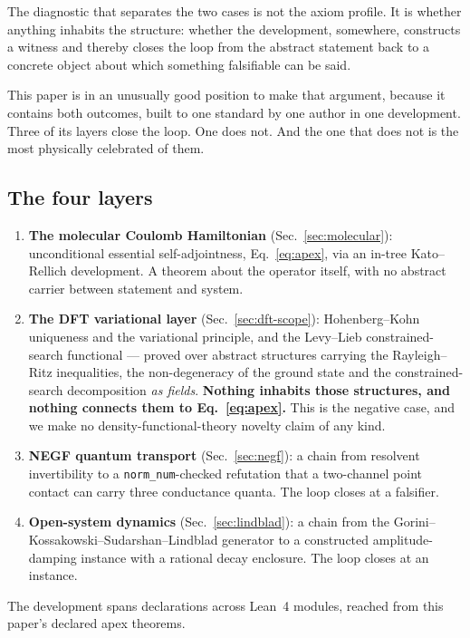 \documentclass[aps,prd,reprint,nofootinbib,superscriptaddress]{revtex4-2}
\newcommand{\Lean}{Lean~4}
\begin{document}
The diagnostic that separates the two cases is not the axiom profile. It is whether anything inhabits
the structure: whether the development, somewhere, constructs a witness and thereby closes the loop
from the abstract statement back to a concrete object about which something falsifiable can be said.

This paper is in an unusually good position to make that argument, because it contains both outcomes,
built to one standard by one author in one development. Three of its layers close the loop. One does
not. And the one that does not is the most physically celebrated of them.

\subsection{The four layers}

\begin{enumerate}
\item \textbf{The molecular Coulomb Hamiltonian} (Sec.~\ref{sec:molecular}): unconditional essential
self-adjointness, Eq.~\eqref{eq:apex}, via an in-tree Kato--Rellich development. A theorem about the
operator itself, with no abstract carrier between statement and system.
\item \textbf{The DFT variational layer} (Sec.~\ref{sec:dft-scope}): Hohenberg--Kohn uniqueness and
the variational principle, and the Levy--Lieb constrained-search functional --- proved over abstract
structures carrying the Rayleigh--Ritz inequalities, the non-degeneracy of the ground state and the
constrained-search decomposition \emph{as fields}. \textbf{Nothing inhabits those structures, and
nothing connects them to Eq.~\eqref{eq:apex}.} This is the negative case, and we make no
density-functional-theory novelty claim of any kind.
\item \textbf{NEGF quantum transport} (Sec.~\ref{sec:negf}): a chain from resolvent invertibility to
a \texttt{norm\_num}-checked refutation that a two-channel point contact can carry three conductance
quanta. The loop closes at a falsifier.
\item \textbf{Open-system dynamics} (Sec.~\ref{sec:lindblad}): a chain from the
Gorini--Kossakowski--Sudarshan--Lindblad generator to a constructed amplitude-damping instance with a
rational decay enclosure. The loop closes at an instance.
\end{enumerate}

The development spans \bundleDecls{} declarations across \bundleModules{} \Lean{} modules, reached
from this paper's declared apex theorems.
\end{document}
